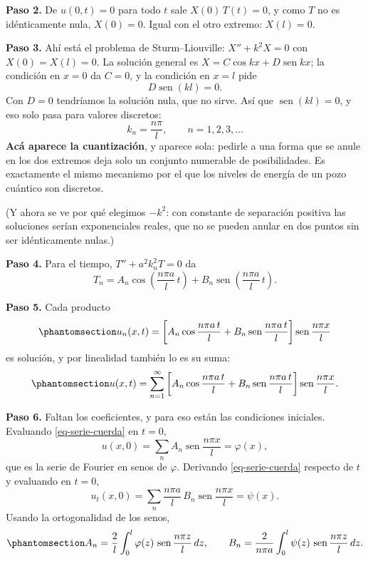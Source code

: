 \documentclass[
  spanish,
  a4paper,
]{scrbook}
\theoremstyle{definition}
\theoremstyle{plain}
\theoremstyle{definition}
\theoremstyle{plain}
\theoremstyle{definition}
\theoremstyle{remark}
\begin{document}
\textbf{Paso 2.} De \(u(0,t)=0\) para todo \(t\) sale \(X(0)\,T(t)=0\),
y como \(T\) no es idénticamente nula, \(X(0)=0\). Igual con el otro
extremo: \(X(l)=0\).

\textbf{Paso 3.} Ahí está el problema de Sturm--Liouville:
\(X''+k^2X=0\) con \(X(0)=X(l)=0\). La solución general es
\(X = C\cos kx + D\operatorname{sen} kx\); la condición en \(x=0\) da
\(C=0\), y la condición en \(x=l\) pide \[
D\operatorname{sen}(kl) = 0 .
\] Con \(D=0\) tendríamos la solución nula, que no sirve. Así que
\(\operatorname{sen}(kl)=0\), y eso solo pasa para valores discretos: \[
k_n = \frac{n\pi}{l}, \qquad n = 1,2,3,\dots
\] \textbf{Acá aparece la cuantización}, y aparece sola: pedirle a una
forma que se anule en los dos extremos deja solo un conjunto numerable
de posibilidades. Es exactamente el mismo mecanismo por el que los
niveles de energía de un pozo cuántico son discretos.

(Y ahora se ve por qué elegimos \(-k^2\): con constante de separación
positiva las soluciones serían exponenciales reales, que no se pueden
anular en dos puntos sin ser idénticamente nulas.)

\textbf{Paso 4.} Para el tiempo, \(T'' + a^2k_n^2T = 0\) da \[
T_n = A_n\cos\!\left(\frac{n\pi a}{l}\,t\right) + B_n\operatorname{sen}\!\left(\frac{n\pi a}{l}\,t\right).
\]

\textbf{Paso 5.} Cada producto
\begin{equation}\protect\phantomsection\label{eq-modo-n}{
u_n(x,t) = \left[A_n\cos\frac{n\pi a\,t}{l} + B_n\operatorname{sen}\frac{n\pi a\,t}{l}\right]
\operatorname{sen}\frac{n\pi x}{l}
}\end{equation} es solución, y por linealidad también lo es su suma:
\begin{equation}\protect\phantomsection\label{eq-serie-cuerda}{
u(x,t) = \sum_{n=1}^{\infty}
\left[A_n\cos\frac{n\pi a\,t}{l} + B_n\operatorname{sen}\frac{n\pi a\,t}{l}\right]
\operatorname{sen}\frac{n\pi x}{l} .
}\end{equation}

\textbf{Paso 6.} Faltan los coeficientes, y para eso están las
condiciones iniciales. Evaluando \ref{eq-serie-cuerda} en \(t=0\), \[
u(x,0) = \sum_n A_n \operatorname{sen}\frac{n\pi x}{l} = \varphi(x),
\] que es la serie de Fourier en senos de \(\varphi\). Derivando
\ref{eq-serie-cuerda} respecto de \(t\) y evaluando en \(t=0\), \[
u_t(x,0) = \sum_n \frac{n\pi a}{l}\,B_n \operatorname{sen}\frac{n\pi x}{l} = \psi(x) .
\] Usando la ortogonalidad de los senos,
\begin{equation}\protect\phantomsection\label{eq-coeficientes-cuerda}{
A_n = \frac{2}{l}\int_0^l \varphi(z)\,\operatorname{sen}\frac{n\pi z}{l}\,dz ,
\qquad
B_n = \frac{2}{n\pi a}\int_0^l \psi(z)\,\operatorname{sen}\frac{n\pi z}{l}\,dz .
}\end{equation}
\end{document}

